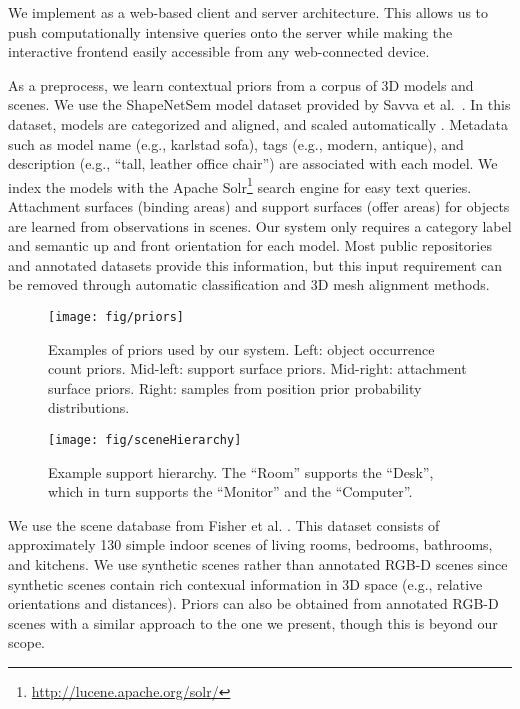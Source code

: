 \documentclass{sigchi}
\begin{document}
We implement \SceneSuggest as a web-based client and server architecture.  This allows us to push computationally intensive queries onto the server while making the interactive frontend easily accessible from any web-connected device.

As a preprocess, we learn contextual priors from a corpus of 3D models and scenes.  We use the ShapeNetSem model dataset provided by Savva et al.~\cite{savva2015semgeo}.  In this dataset, models are categorized and aligned, and scaled automatically   \cite{savva2014sizes}.  Metadata such as model name (e.g., karlstad sofa), tags (e.g., modern, antique), and description (e.g., ``tall, leather office chair'') are associated with each model.  We index the models with the Apache Solr\footnote{\url{http://lucene.apache.org/solr/}} search engine for easy text queries.  Attachment surfaces (binding areas) and support surfaces (offer areas) for objects are learned from observations in scenes.  Our system only requires a category label and semantic up and front orientation for each model.  Most public repositories and annotated datasets provide this information, but this input requirement can be removed through automatic classification and 3D mesh alignment methods.

\begin{figure*}
  \vspace{-2em}
  \texttt{[image: fig/priors]}
  \caption{Examples of priors used by our system. Left: object occurrence count priors. Mid-left: support surface priors. Mid-right: attachment surface priors. Right: samples from position prior probability distributions.}
  \label{fig:priors}
  \vspace{-1em}
\end{figure*}

\begin{figure}
  \texttt{[image: fig/sceneHierarchy]}
  \caption{Example support hierarchy.  The ``Room'' supports the ``Desk'', which in turn supports the ``Monitor'' and the ``Computer''.}
  \label{fig:sceneHierarchy}
\end{figure}


We use the scene database from Fisher et al. \cite{fisher2012example}.  This dataset consists of approximately 130 simple indoor scenes of living rooms, bedrooms, bathrooms, and kitchens.  We use synthetic scenes rather than annotated RGB-D scenes since synthetic scenes contain rich contexual information in 3D space (e.g., relative orientations and distances).  Priors can also be obtained from annotated RGB-D scenes with a similar approach to the one we present, though this is beyond our scope.
\end{document}
